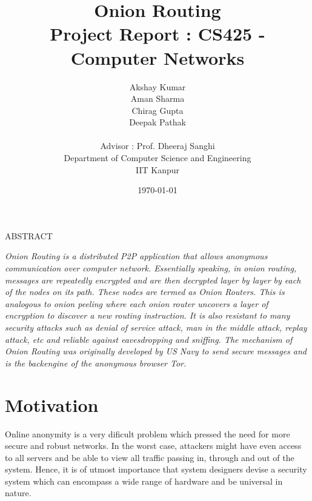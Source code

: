 \documentclass{article}
\title{\textbf{Onion Routing}\\
\large{Project Report : CS425 - Computer Networks}}
\author{Akshay Kumar\\
	Aman Sharma\\
	Chirag Gupta\\
	Deepak Pathak\\
	\\
	Advisor : Prof. Dheeraj Sanghi\\
        Department of Computer Science and Engineering\\
        IIT Kanpur
	}
\date{\today}
\begin{document}
\maketitle

\begin{center}{ABSTRACT}
\end{center}
\textit{Onion Routing is a distributed P2P application that allows anonymous communication over computer network. Essentially speaking, in onion routing, messages are repeatedly encrypted and are then decrypted layer by layer by each of the nodes on its path. These nodes are termed as Onion Routers. This is analogous to onion peeling where each onion router uncovers a layer of encryption to discover a new routing instruction. It is also resistant to many security attacks such as denial of service attack, man in the middle attack, replay attack, etc and reliable against eavesdropping and sniffing. The mechanism of Onion Routing was originally developed by US Navy to send secure messages and is the backengine of the anonymous browser Tor.}

\section{Motivation}
Online anonymity is a very dificult problem which pressed the need for more secure and robust networks. In the worst case, attackers might have even access to all servers and be able to view all traffic passing in, through and out of the system. Hence, it is of utmost importance that system designers devise a security system which can encompass a wide range of hardware and be universal in nature. 
\end{document}
